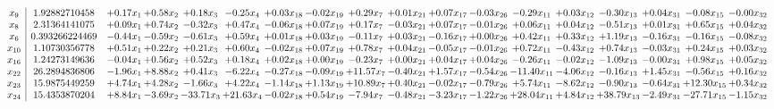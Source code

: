 \documentclass[9pt]{article}
\begin{document}
\[\begin{array}{c| c c@{\hskip 2pt} c@{\hskip 2pt} c@{\hskip 2pt} c@{\hskip 2pt} c@{\hskip 2pt} c@{\hskip 2pt} c@{\hskip 2pt} c@{\hskip 2pt} c@{\hskip 2pt} c@{\hskip 2pt} c@{\hskip 2pt} c@{\hskip 2pt} c@{\hskip 2pt} c@{\hskip 2pt} c@{\hskip 2pt} c@{\hskip 2pt} }
 x_{9}   &  1.92882710458 & +  0.17 x_{1} & +  0.58 x_{2} & +  0.18 x_{3} & -0.25 x_{4} & +  0.03 x_{18} & -0.02 x_{19} & +  0.29 x_{7} & +  0.01 x_{21} & +  0.07 x_{17} & -0.03 x_{26} & -0.29 x_{11} & +  0.03 x_{12} & -0.30 x_{13} & +  0.04 x_{31} & -0.08 x_{15} & -0.00 x_{32}\\
 x_{8}   &  2.31364141075 & +  0.09 x_{1} & +  0.74 x_{2} & -0.32 x_{3} & +  0.47 x_{4} & -0.06 x_{18} & +  0.07 x_{19} & +  0.17 x_{7} & -0.03 x_{21} & +  0.07 x_{17} & -0.01 x_{26} & +  0.06 x_{11} & +  0.04 x_{12} & -0.51 x_{13} & +  0.01 x_{31} & +  0.65 x_{15} & +  0.04 x_{32}\\
 x_{6}   &  0.393266224469 & -0.44 x_{1} & -0.59 x_{2} & -0.61 x_{3} & +  0.59 x_{4} & +  0.01 x_{18} & +  0.03 x_{19} & -0.11 x_{7} & +  0.03 x_{21} & -0.16 x_{17} & +  0.00 x_{26} & +  0.42 x_{11} & +  0.33 x_{12} & +  1.19 x_{13} & -0.16 x_{31} & -0.16 x_{15} & -0.08 x_{32}\\
 x_{10}   &  1.10730356778 & +  0.51 x_{1} & +  0.22 x_{2} & +  0.21 x_{3} & +  0.60 x_{4} & -0.02 x_{18} & +  0.07 x_{19} & +  0.78 x_{7} & +  0.04 x_{21} & -0.05 x_{17} & -0.01 x_{26} & +  0.72 x_{11} & -0.43 x_{12} & +  0.74 x_{13} & -0.03 x_{31} & +  0.24 x_{15} & +  0.03 x_{32}\\
 x_{16}   &  1.24273149636 & -0.04 x_{1} & +  0.56 x_{2} & +  0.52 x_{3} & +  0.18 x_{4} & +  0.02 x_{18} & +  0.00 x_{19} & -0.23 x_{7} & +  0.00 x_{21} & +  0.04 x_{17} & +  0.04 x_{26} & -0.26 x_{11} & -0.02 x_{12} & -1.09 x_{13} & -0.00 x_{31} & +  0.98 x_{15} & +  0.05 x_{32}\\
 x_{22}   &  26.2894836806 & -1.96 x_{1} & +  8.88 x_{2} & +  0.41 x_{3} & -6.22 x_{4} & -0.27 x_{18} & -0.09 x_{19} & + 11.57 x_{7} & -0.40 x_{21} & +  1.57 x_{17} & -0.54 x_{26} & -11.40 x_{11} & -4.06 x_{12} & -0.16 x_{13} & +  1.45 x_{31} & -0.56 x_{15} & +  0.16 x_{32}\\
 x_{23}   &  15.9875449259 & +  4.74 x_{1} & +  4.28 x_{2} & -1.66 x_{3} & +  4.22 x_{4} & -1.14 x_{18} & +  1.13 x_{19} & + 10.89 x_{7} & +  0.40 x_{21} & -0.02 x_{17} & -0.79 x_{26} & +  5.74 x_{11} & -8.62 x_{12} & -0.90 x_{13} & -0.64 x_{31} & + 12.30 x_{15} & +  0.34 x_{32}\\
 x_{24}   &  15.4353870204 & +  8.84 x_{1} & -3.69 x_{2} & -33.71 x_{3} & + 21.63 x_{4} & -0.02 x_{18} & +  0.54 x_{19} & -7.94 x_{7} & -0.48 x_{21} & -3.23 x_{17} & -1.22 x_{26} & + 28.04 x_{11} & +  4.84 x_{12} & + 38.79 x_{13} & -2.49 x_{31} & -27.71 x_{15} & -1.15 x_{32}\\

\end{array}\]
\end{document}
